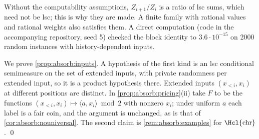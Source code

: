 Without the computability assumptions, $Z_{i+1}/Z_i$ is a ratio of lsc sums, which need not be lsc; this is why they are made. A finite family with rational values and rational weights also satisfies them. A direct computation (code in the accompanying repository, seed 5) checked the block identity to $3.6\cdot10^{-15}$ on 2000 random instances with history-dependent inputs.

We prove \cref{prop:absorb:inputs}. A hypothesis of the first kind is an lsc conditional semimeasure on the set of extended inputs, with private randomness per extended input, so it is a product hypothesis there. Extended inputs $(x_{<i},x_i)$ at different positions are distinct. In \cref{prop:absorb:pricing}(ii) take $F$ to be the functions $(x_{<i},x_i)\mapsto\langle a,x_i\rangle\bmod2$ with nonzero $x_i$; under uniform $a$ each label is a fair coin, and the argument is unchanged, as is that of \cref{cor:absorb:nouniversal}. The second claim is \cref{rem:absorb:examples} for $\Hcl{\mathrm{chr}}$. \qed
